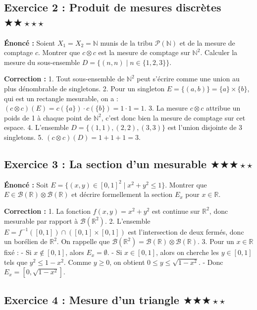\documentclass[11pt,a4paper]{article}
\begin{document}
\subsection*{Exercice 2 : Produit de mesures discrètes \quad $\bigstar\bigstar\star\star\star$}

\textbf{Énoncé :}
Soient $X_1 = X_2 = \mathbb{N}$ munis de la tribu $\mathcal{P}(\mathbb{N})$ et de la mesure de comptage $c$.
Montrer que $c \otimes c$ est la mesure de comptage sur $\mathbb{N}^2$. Calculer la mesure du sous-ensemble $D = \{ (n, n) \mid n \in \{1, 2, 3\} \}$.

\textbf{Correction :}
1. Tout sous-ensemble de $\mathbb{N}^2$ peut s'écrire comme une union au plus dénombrable de singletons.
2. Pour un singleton $E = \{(a, b)\} = \{a\} \times \{b\}$, qui est un rectangle mesurable, on a :
   $(c \otimes c)(E) = c(\{a\}) \cdot c(\{b\}) = 1 \cdot 1 = 1$.
3. La mesure $c \otimes c$ attribue un poids de 1 à chaque point de $\mathbb{N}^2$, c'est donc bien la mesure de comptage sur cet espace.
4. L'ensemble $D = \{(1,1), (2,2), (3,3)\}$ est l'union disjointe de 3 singletons.
5. $(c \otimes c)(D) = 1 + 1 + 1 = 3$.

\subsection*{Exercice 3 : La section d'un mesurable \quad $\bigstar\bigstar\bigstar\star\star$}

\textbf{Énoncé :}
Soit $E = \{ (x,y) \in [0,1]^2 \mid x^2 + y^2 \le 1 \}$.
Montrer que $E \in \mathcal{B}(\mathbb{R}) \otimes \mathcal{B}(\mathbb{R})$ et décrire formellement la section $E_x$ pour $x \in \mathbb{R}$.

\textbf{Correction :}
1. La fonction $f(x,y) = x^2 + y^2$ est continue sur $\mathbb{R}^2$, donc mesurable par rapport à $\mathcal{B}(\mathbb{R}^2)$.
2. L'ensemble $E = f^{-1}([0, 1]) \cap ([0,1] \times [0,1])$ est l'intersection de deux fermés, donc un borélien de $\mathbb{R}^2$. On rappelle que $\mathcal{B}(\mathbb{R}^2) = \mathcal{B}(\mathbb{R}) \otimes \mathcal{B}(\mathbb{R})$.
3. Pour un $x \in \mathbb{R}$ fixé :
   - Si $x \notin [0, 1]$, alors $E_x = \emptyset$.
   - Si $x \in [0, 1]$, alors on cherche les $y \in [0, 1]$ tels que $y^2 \le 1 - x^2$. Comme $y \ge 0$, on obtient $0 \le y \le \sqrt{1 - x^2}$.
   - Donc $E_x = [0, \sqrt{1 - x^2}]$.

\subsection*{Exercice 4 : Mesure d'un triangle \quad $\bigstar\bigstar\bigstar\star\star$}
\end{document}
